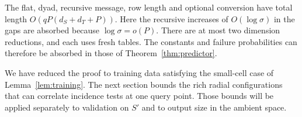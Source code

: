 The flat, dyad, recursive message, row length and optional conversion
have total length \(O(qP(d_S+d_T+P))\).
Here the recursive increases of \(O(\log\sigma)\) in the gaps
are absorbed because \(\log\sigma=o(P)\).
There are at most two dimension reductions, and each uses
fresh tables. The constants and failure probabilities can
therefore be absorbed in those of Theorem~\ref{thm:predictor}.

We have reduced the proof to training data satisfying the small-cell
case of Lemma~\ref{lem:training}. The next section bounds the rich
radial configurations that can correlate incidence tests at one
query point. Those bounds will be applied separately to validation
on \(S'\) and to output size in the ambient space.

